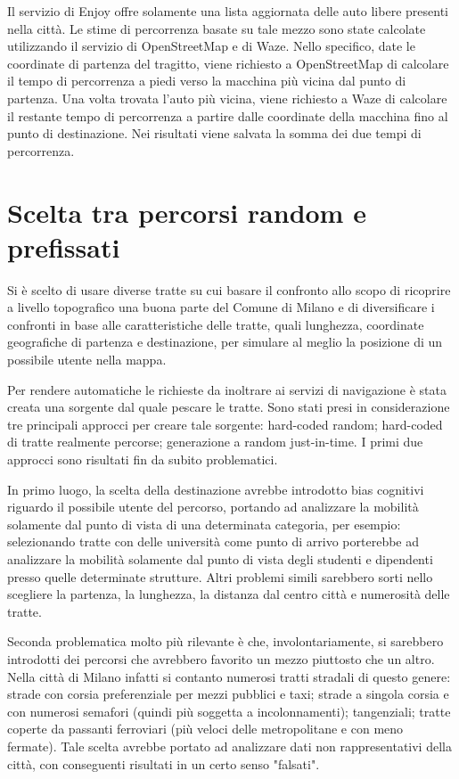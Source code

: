 Il servizio di Enjoy offre solamente una lista aggiornata delle auto libere presenti nella città. Le stime di percorrenza basate su tale mezzo sono state calcolate utilizzando il servizio di OpenStreetMap e di Waze. Nello specifico, date le coordinate di partenza del tragitto, viene richiesto a OpenStreetMap di calcolare il tempo di percorrenza a piedi verso la macchina più vicina dal punto di partenza. Una volta trovata l'auto più vicina, viene richiesto a Waze di calcolare il restante tempo di percorrenza a partire dalle coordinate della macchina fino al punto di destinazione. Nei risultati viene salvata la somma dei due tempi di percorrenza.


\section{Scelta tra percorsi random e prefissati}

Si è scelto di usare diverse tratte su cui basare il confronto allo scopo di ricoprire a livello topografico una buona parte del Comune di Milano e di diversificare i confronti in base alle caratteristiche delle tratte, quali lunghezza, coordinate geografiche di partenza e destinazione, per simulare al meglio la posizione di un possibile utente nella mappa.

Per rendere automatiche le richieste da inoltrare ai servizi di navigazione è stata creata una sorgente dal quale pescare le tratte. Sono stati presi in considerazione tre principali approcci per creare tale sorgente: hard-coded random; hard-coded di tratte realmente percorse; generazione a random just-in-time. I primi due approcci sono risultati fin da subito problematici.

In primo luogo, la scelta della destinazione avrebbe introdotto bias cognitivi riguardo il possibile utente del percorso, portando ad analizzare la mobilità solamente dal punto di vista di una determinata categoria, per esempio: selezionando tratte con delle università come punto di arrivo porterebbe ad analizzare la mobilità solamente dal punto di vista degli studenti e dipendenti presso quelle determinate strutture. Altri problemi simili sarebbero sorti nello scegliere la partenza, la lunghezza, la distanza dal centro città e numerosità delle tratte.

Seconda problematica molto più rilevante è che, involontariamente, si sarebbero introdotti dei percorsi che avrebbero favorito un mezzo piuttosto che un altro. Nella città di Milano infatti si contanto numerosi tratti stradali di questo genere: strade con corsia preferenziale per mezzi pubblici e taxi; strade a singola corsia e con numerosi semafori (quindi più soggetta a incolonnamenti); tangenziali; tratte coperte da passanti ferroviari (più veloci delle metropolitane e con meno fermate). Tale scelta avrebbe portato ad analizzare dati non rappresentativi della città, con conseguenti risultati in un certo senso "falsati".

